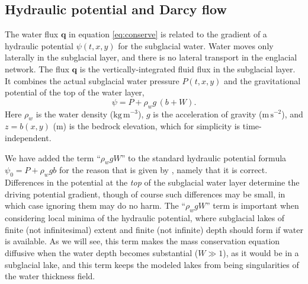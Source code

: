 \documentclass[11pt,final]{amsart}
\newcommand\bq{\mathbf{q}}
\begin{document}
\subsection*{Hydraulic potential and Darcy flow}  The water flux $\bq$ in equation \eqref{eq:conserve} is related to the gradient of a hydraulic potential $\psi(t,x,y)$ for the subglacial water.  Water moves only laterally in the subglacial layer, and there is no lateral transport in the englacial network.  The flux $\bq$ is the vertically-integrated fluid flux in the subglacial layer.  It combines the actual subglacial water pressure $P(t,x,y)$ and the gravitational potential of the top of the water layer,
\begin{equation} \label{eq:potential}
\psi = P + \rho_w g\, (b+W).
\end{equation}
Here $\rho_w$ is the water density ($\text{kg}\,\text{m}^{-3}$), $g$ is the acceleration of gravity ($\text{m}\,\text{s}^{-2}$), and $z=b(x,y)$ ($\text{m}$) is the bedrock elevation, which for simplicity is time-independent.

We have added the term ``$\rho_w g W$'' to the standard hydraulic potential formula $\psi_0 = P + \rho_w g b$ \citep[for example]{Clarke05} for the reason that is given by \cite{Hewittetal2012}, namely that it is correct.  Differences in the potential at the \emph{top} of the subglacial water layer determine the driving potential gradient, though of course such differences may be small, in which case ignoring them may do no harm.  The  ``$\rho_w g W$'' term is important when considering local minima of the hydraulic potential, where subglacial lakes of finite (not infinitesimal) extent and finite (not infinite) depth should form if water is available.  As we will see, this term makes the mass conservation equation diffusive when the water depth becomes substantial ($W\gg 1$), as it would be in a subglacial lake, and this term keeps the modeled lakes from being singularities of the water thickness field.
\end{document}
